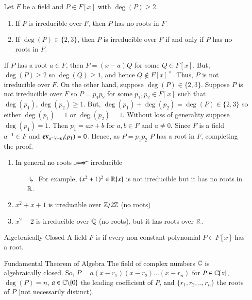 \documentclass[12pt, a4paper, twoside, openright, titlepage]{book}
\begin{document}
\begin{prop}{}{}
    Let $F$ be a field and $P \in F[x]$ with $\deg(P) \geq 2$.  
    \begin{enumerate}
        \item If $P$ is irreducible over $F$, then $P$ has no roots in $F$
        \item If $\deg(P) \in \{2,3\}$, then $P$ is irreducible over $F$ if and only if $P$ has no roots in $F$.
    \end{enumerate}
\end{prop}
\begin{proof*}{}{}
    If $P$ has a root $a \in F$, then $P = (x-a)Q$ for some $Q \in F[x]$. But, $\deg(P) \geq 2$ so $\deg(Q) \geq 1$, and hence $Q \notin F[x]^{\times}$. Thus, $P$ is not irreducible over $F$. On the other hand, suppose $\deg(P) \in \{2,3\}$. Suppose $P$ is not irreducible over $F$ so $P = p_1p_2$ for some $p_1, p_2 \in F[x]$ such that $\deg(p_1),\deg(p_2) \geq 1$. But, $\deg(p_1)+\deg(p_2) = \deg(P) \in \{2,3\}$ so either $\deg(p_1) = 1$ or $\deg(p_2) = 1$. Without loss of generality suppose $\deg(p_1) = 1$. Then $p_1 = ax+b$ for $a,b \in F$ and $a \neq 0$. Since $F$ is a field $a^{-1} \in F$ and $\operatorname{\bf{ev}}_{a^{-1}(-b)}(p_1) = 0$. Hence, as $P = p_1p_2$ $P$ has a root in $F$, completing the proof.
\end{proof*}

\begin{rmk}{}{}
    \leavevmode
    \begin{enumerate}
        \item In general no roots $\cancel{\implies}$ irreducible
        \begin{enumerate}
            \item[$\drsh$] For example, $(x^2+1)^2 \in \mathbb R[x]$ is not irreducible but it has no roots in $\mathbb R$. 
        \end{enumerate}
        \item $x^2+x+1$ is irreducible over $\mathbb Z/2\mathbb Z$ (no roots)
        \item $x^2-2$ is irreducible over $\mathbb Q$ (no roots), but it has roots over $\mathbb R$.
    \end{enumerate}
\end{rmk}

\begin{defn}{Algebraically Closed}{}
    A field $F$ is  if every non-constant polynomial $P \in F[x]$ has a root.
\end{defn}

\begin{namthm}{Fundamental Theorem of Algebra}{}
    The field of complex numbers $\mathbb C$ is algebraically closed. So, $P = a(x-r_1)(x-r_2)...(x-r_n)$ for $P \in \mathbb C[x]$, $\deg(P) = n$, $a \in \mathbb C\backslash\{0\}$ the leading coefficient of $P$, and $\{r_1,r_2,..,r_n\}$ the roots of $P$ (not necessarily distinct).
\end{namthm}
\end{document}

